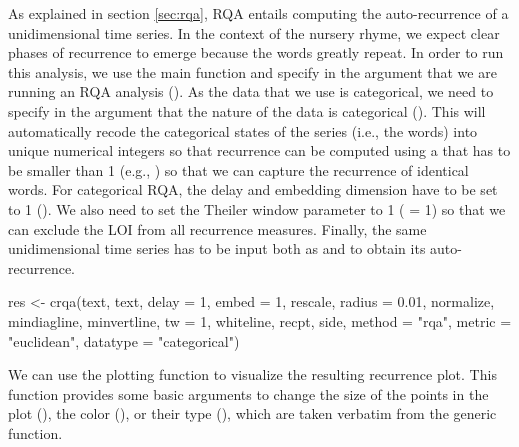 As explained in section \ref{sec:rqa}, RQA entails computing the auto-recurrence of a unidimensional time series. In the context of the nursery rhyme, we expect clear phases of recurrence to emerge because the words greatly repeat. 
In order to run this analysis, we use the main function  and specify in the argument  that we are running an RQA analysis (). As the data that we use is categorical, we need to specify in the argument  that the nature of the data is categorical (). This will automatically recode the categorical states of the series (i.e., the words) into unique numerical integers so that recurrence can be computed using a  that has to be smaller than 1 (e.g., ) so that we can capture the recurrence of identical words. For categorical RQA, the delay and embedding dimension have to be set to 1 (). We also need to set the Theiler window parameter to 1 ( = 1) so that we can exclude the LOI from all recurrence measures. Finally, the same unidimensional time series has to be input both as  and  to obtain its auto-recurrence.  

\begin{example}
res <- crqa(text, text, delay = 1, embed = 1, rescale, radius = 0.01, normalize,
            mindiagline, minvertline, tw = 1, whiteline, recpt, side, method = "rqa",
            metric = "euclidean", datatype = "categorical")
\end{example}
%
We can use the plotting function  to visualize the resulting recurrence plot. This function provides some basic arguments to change the size of the points in the plot (), the color (), or their type (), which are taken verbatim from the generic  function.


